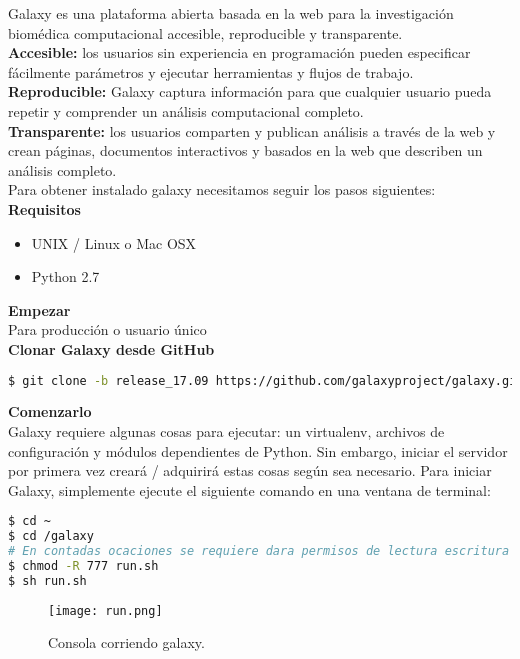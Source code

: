 \documentclass[12pt,letterpaper]{article}
\begin{document}
Galaxy es una plataforma abierta basada en la web para la investigación biomédica computacional accesible, reproducible y transparente.\\

\textbf{Accesible:} los usuarios sin experiencia en programación pueden especificar fácilmente parámetros y ejecutar herramientas y flujos de trabajo.\\
\textbf{Reproducible:} Galaxy captura información para que cualquier usuario pueda repetir y comprender un análisis computacional completo.\\
\textbf{Transparente:} los usuarios comparten y publican análisis a través de la web y crean páginas, documentos interactivos y basados ​​en la web que describen un análisis completo.\\

Para obtener instalado galaxy necesitamos seguir los pasos siguientes:\\

\textbf{Requisitos}
\begin{itemize}
\item UNIX / Linux o Mac OSX
\item Python 2.7
\end{itemize}

\textbf{Empezar}\\

Para producción o usuario único\\

\textbf{Clonar Galaxy desde GitHub}\\
\begin{lstlisting}[language=bash, style=consola]
$ git clone -b release_17.09 https://github.com/galaxyproject/galaxy.git
\end{lstlisting}

\textbf{Comenzarlo}
\\
Galaxy requiere algunas cosas para ejecutar: un virtualenv, archivos de configuración y módulos dependientes de Python. Sin embargo, iniciar el servidor por primera vez creará / adquirirá estas cosas según sea necesario. Para iniciar Galaxy, simplemente ejecute el siguiente comando en una ventana de terminal:
\begin{lstlisting}[language=bash, style=consola]
$ cd ~
$ cd /galaxy
# En contadas ocaciones se requiere dara permisos de lectura escritura y ejecución para ello ponmos en terminal:
$ chmod -R 777 run.sh
$ sh run.sh
\end{lstlisting}

\begin{figure}[h]
\begin{center}
\texttt{[image: run.png]}
\end{center}
\caption{Consola corriendo galaxy.}
\end{figure}
\end{document}
